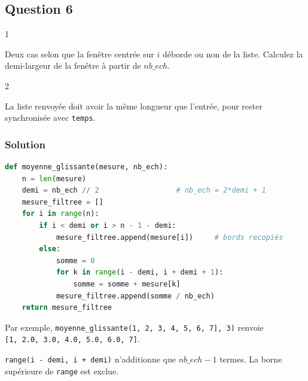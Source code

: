 \documentclass[11pt,a4paper]{article}
\begin{document}
\hypertarget{question-6}{%
\subsection{Question 6}\label{question-6}}

\begin{indication}{1}

Deux cas selon que la fenêtre centrée sur \(i\) déborde ou non de la liste. Calculez la demi-largeur de la fenêtre à partir de \(nb\_ech\).

\end{indication}

\begin{indication}{2}

La liste renvoyée doit avoir la même longueur que l'entrée, pour rester synchronisée avec \texttt{temps}.

\end{indication}

\hypertarget{solution-5}{%
\subsubsection{Solution}\label{solution-5}}

\begin{lstlisting}[language=Python]
def moyenne_glissante(mesure, nb_ech):
    n = len(mesure)
    demi = nb_ech // 2                  # nb_ech = 2*demi + 1
    mesure_filtree = []
    for i in range(n):
        if i < demi or i > n - 1 - demi:
            mesure_filtree.append(mesure[i])     # bords recopiés
        else:
            somme = 0
            for k in range(i - demi, i + demi + 1):
                somme = somme + mesure[k]
            mesure_filtree.append(somme / nb_ech)
    return mesure_filtree
\end{lstlisting}

Par exemple, \texttt{moyenne\_glissante(\allowbreak{}{[}1,\allowbreak{}\ 2,\allowbreak{}\ 3,\allowbreak{}\ 4,\allowbreak{}\ 5,\allowbreak{}\ 6,\allowbreak{}\ 7{]}\allowbreak{},\allowbreak{}\ 3)\allowbreak{}} renvoie \texttt{{[}1,\allowbreak{}\ 2.0,\allowbreak{}\ 3.0,\allowbreak{}\ 4.0,\allowbreak{}\ 5.0,\allowbreak{}\ 6.0,\allowbreak{}\ 7{]}\allowbreak{}}.

\begin{piege}

\texttt{range(\allowbreak{}i\ -\ demi,\allowbreak{}\ i\ +\ demi)\allowbreak{}} n'additionne que \(nb\_ech-1\) termes. La borne supérieure de \texttt{range} est exclue.

\end{piege}
\end{document}
